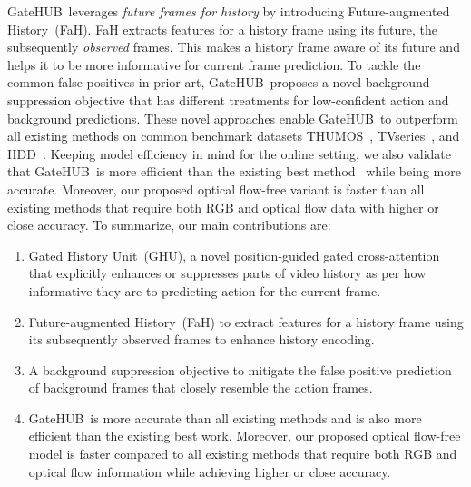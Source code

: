 \documentclass[10pt,twocolumn,letterpaper]{article}
\newcommand{\methodname}{GateHUB}
\begin{document}
\methodname~leverages \textit{future frames for history} by introducing Future-augmented History~(FaH). FaH extracts features for a history frame using its future, \ie the subsequently \textit{observed} frames. This makes a history frame aware of its future and helps it to be more informative for current frame prediction. To tackle the common false positives in prior art, \methodname~proposes a novel background suppression objective that has different treatments for low-confident action and background predictions. These novel approaches enable \methodname~to outperform all existing methods on common benchmark datasets THUMOS~\cite{THUMOS14}, TVseries~\cite{de2016online}, and HDD~\cite{ramanishka2018toward}.  Keeping model efficiency in mind for the online setting, we also validate that \methodname~is more efficient than the existing best method~\cite{xu2021long} while being more accurate. Moreover, our proposed optical flow-free variant is  faster than all existing methods that require both RGB and optical flow data with higher or close accuracy.
To summarize, our main contributions are:
\begin{enumerate}
	\item Gated History Unit~(GHU), a novel position-guided gated cross-attention that explicitly enhances or suppresses parts of video history as per how informative they are to predicting action for the current frame.
	\item Future-augmented History~(FaH) to extract features for a history frame using its subsequently observed frames to enhance history encoding. 
\item A background suppression objective to mitigate the false positive prediction of background frames that closely resemble the action frames.
	\item \methodname~is more accurate than all existing methods and is also more efficient than the existing best work. Moreover, our proposed optical flow-free model is  faster compared to all existing methods that require both RGB and optical flow information while achieving higher or close accuracy.
\end{enumerate}
\end{document}
